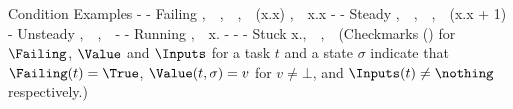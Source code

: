 \starttabulate[|cM|cM|cM|l|lM|]
  \FL
  \NC \Failing   \NC \Value     \NC \Inputs    \NC \alert{Condition} \NC \alert{Examples}                                                                                                           \NR
  \ML
  \NC \checkmark \NC -          \NC -          \NC Failing           \NC \Fail, \,\, \Fail \Pair \Fail, \,\, \Fail \Choose \Fail, \,\, (\lambda x.x) \Trans \Fail, \,\, \Fail \Step \lambda x.\Lift x \NR
  \NC -          \NC \checkmark \NC -          \NC Steady            \NC {}, \,\,  \Pair {}, \,\, \Lift {}, \,\, (\lambda x.x + 1) \Trans {}                          \NR
  \NC -          \NC \checkmark \NC \checkmark \NC Unsteady          \NC {}, \,\,  \Pair {}, \,\, \Update {}                                                       \NR
  \NC -          \NC -          \NC \checkmark \NC Running           \NC \Enter \Int \Pair \Fail, \,\,  \Step \lambda x.\Fail                                                              \NR
  \NC -          \NC -          \NC -          \NC Stuck             \NC {} \Step \lambda x.\Fail, \,\,  \Pair \Fail, \,\, \Fail \Pair {}                                          \NR
  \LL
\stoptabulate
\noindentation
(Checkmarks (\checkmark) for $\Failing$, $\Value$ and $\Inputs$ for a task $t$ and a state $\sigma$ indicate that
  $\Failing(t) = \True$,
  $\Value(t, \sigma) = v$ for $v \neq \bot$, and
  $\Inputs(t) \neq \nothing$ respectively.)

